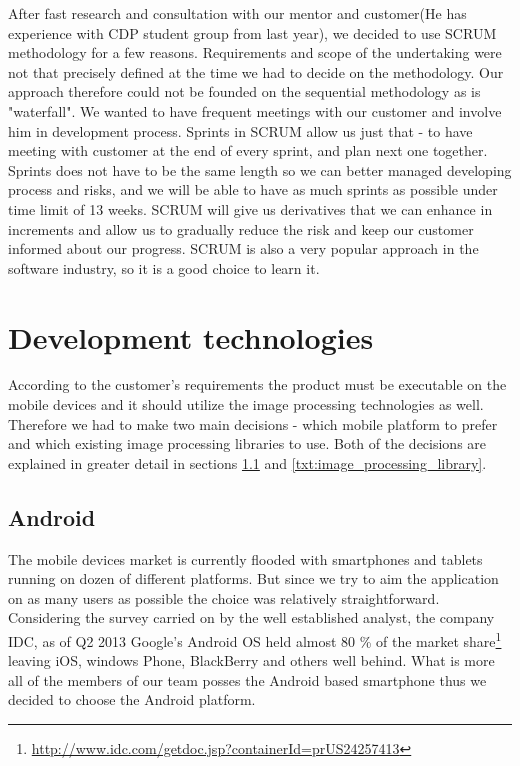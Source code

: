 After fast research and consultation with our mentor and customer(He has experience with CDP student group from last year), we decided to use SCRUM methodology for a few reasons. Requirements and scope of the undertaking were not that precisely defined at the time we had to decide on the methodology. Our approach therefore could not be founded on the sequential methodology as is "waterfall". We wanted to have frequent meetings with our customer and involve him in development process. Sprints in SCRUM allow us just that - 
to have meeting with customer at the end of every sprint, and plan next one together. Sprints does not have to be the same length so we can better managed developing process and risks, and we will be able to have as much sprints as possible under time limit of 13 weeks. SCRUM will give us derivatives that we can enhance in increments and allow us to gradually reduce the risk and keep our customer informed about our progress. SCRUM is also a very popular approach in the software industry, so it is a good choice to learn it.

\section{Development technologies} \label{txt:development technologies}

According to the customer's requirements the product must be executable on the mobile devices and it should utilize the image processing technologies as well. Therefore we had to make two main decisions - which mobile platform to prefer and which existing image processing libraries to use. Both of the decisions are explained in greater detail in sections \ref{txt:mobile_platform} and \ref{txt:image_processing_library}.


\subsection{Android} \label{txt:mobile_platform}

The mobile devices market is currently flooded with smartphones and tablets running on dozen of different platforms. 
But since we try to aim the application on as many users as possible the choice was relatively straightforward.
Considering the survey carried on by the well established analyst, the company IDC, as of Q2 2013 Google's Android OS held almost 80 \% of the market share\footnote{\url{http://www.idc.com/getdoc.jsp?containerId=prUS24257413}} leaving iOS, windows Phone, BlackBerry and others well behind.
What is more all of the members of our team posses the Android based smartphone thus we decided to choose the Android platform.

